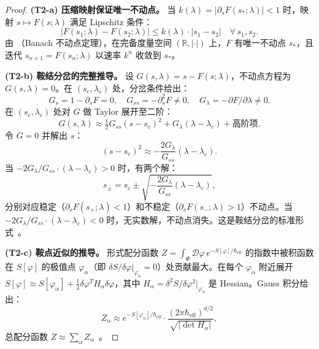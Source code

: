 \documentclass[12pt,a4paper]{article}
\theoremstyle{definition}
\newcommand{\mPhi}{\Phi}
\newcommand{\R}{\mathbb{R}}
\newcommand{\Heff}{\hbar_{\mathrm{eff}}}
\begin{document}
\begin{proof}
\textbf{(T2-a) 压缩映射保证唯一不动点。}
当 $k(\lambda) = |\partial_s F(s_*; \lambda)| < 1$ 时，映射 $s \mapsto F(s; \lambda)$ 满足 Lipschitz 条件：
\begin{equation}
|F(s_1; \lambda) - F(s_2; \lambda)| \leq k(\lambda) \cdot |s_1 - s_2| \quad \forall\, s_1, s_2.
\end{equation}
由 （Banach 不动点定理），在完备度量空间 $(\R, |\cdot|)$ 上，$F$ 有唯一不动点 $s_*$，且迭代 $s_{n+1} = F(s_n; \lambda)$ 以速率 $k^n$ 收敛到 $s_*$。

\textbf{(T2-b) 鞍结分岔的完整推导。}
设 $G(s, \lambda) = s - F(s; \lambda)$，不动点方程为 $G(s, \lambda) = 0$。在 $(s_c, \lambda_c)$ 处，分岔条件给出：
\begin{equation}
G_s = 1 - \partial_s F = 0, \quad G_{ss} = -\partial_s^2 F \neq 0, \quad G_\lambda = -\partial F/\partial\lambda \neq 0.
\end{equation}
在 $(s_c, \lambda_c)$ 处对 $G$ 做 Taylor 展开至二阶：
\begin{equation}
G(s, \lambda) \approx \tfrac{1}{2} G_{ss} (s - s_c)^2 + G_\lambda (\lambda - \lambda_c) + \text{高阶项}.
\end{equation}
令 $G = 0$ 并解出 $s$：
\begin{equation}
(s - s_c)^2 \approx -\frac{2 G_\lambda}{G_{ss}} (\lambda - \lambda_c).
\end{equation}
当 $-2G_\lambda / G_{ss} \cdot (\lambda - \lambda_c) > 0$ 时，有两个解：
\begin{equation}
s_\pm = s_c \pm \sqrt{-\frac{2 G_\lambda}{G_{ss}} (\lambda - \lambda_c)},
\end{equation}
分别对应稳定（$\partial_s F(s_+; \lambda) < 1$）和不稳定（$\partial_s F(s_-; \lambda) > 1$）不动点。当 $-2G_\lambda / G_{ss} \cdot (\lambda - \lambda_c) < 0$ 时，无实数解，不动点消失。这是鞍结分岔的标准形式~\cite{Strogatz2014, Kuznetsov2004}。

\textbf{(T2-c) 鞍点近似的推导。}
形式配分函数 $Z = \int_\mPhi \mathcal{D}\varphi \, e^{-S[\varphi]/\Heff}$ 的指数中被积函数在 $S[\varphi]$ 的极值点 $\varphi_\alpha$（即 $\delta S / \delta\varphi|_{\varphi_\alpha} = 0$）处贡献最大。在每个 $\varphi_\alpha$ 附近展开 $S[\varphi] \approx S[\varphi_\alpha] + \tfrac{1}{2} \delta\varphi^T H_\alpha \delta\varphi$，其中 $H_\alpha = \delta^2 S / \delta\varphi^2|_{\varphi_\alpha}$ 是 Hessian。Gauss 积分给出：
\begin{equation}
Z_\alpha \approx e^{-S[\varphi_\alpha]/\Heff} \cdot \frac{(2\pi\Heff)^{d/2}}{\sqrt{|\det H_\alpha|}},
\end{equation}
总配分函数 $Z \approx \sum_\alpha Z_\alpha$~\cite{Kleinert2009, ZinnJustin2002}。


\end{proof}
\end{document}
